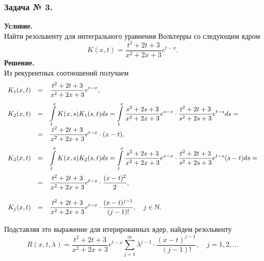 \subsubsection*{\center Задача № 3.}
{\bf Условие.~}\\
Найти резольвенту для интегрального уравнения Вольтерры со следующим ядром 
$$K(x,t)=\dfrac{t^2+2t+3}{x^2+2x+3}e^{t-x}.$$
\noindent
{\bf Решение.~}\\
Из рекурентных соотношений получаем
$$
\begin{array}{rcl}
K_1(x,t)&=&\displaystyle \dfrac{t^2+2t+3}{x^2+2x+3}e^{t-x}, \\[12pt]
K_2(x,t)&=&\displaystyle\int\limits_t^x K(x,s)K_1(s,t)ds = \int\limits_t^x \dfrac{s^2+2s+3}{x^2+2x+3}e^{s-x}\cdot\dfrac{t^2+2t+3}{s^2+2s+3}e^{t-s} ds = \\ [12pt] 
&=& \dfrac{t^2+2t+3}{x^2+2x+3}e^{t-x}\cdot(x-t),\\[12pt] \medskip
K_3(x,t)&=&\displaystyle\int\limits_t^x K(x,s)K_2(s,t)ds = \int\limits_t^x \dfrac{s^2+2s+3}{x^2+2x+3}e^{s-x}\cdot\dfrac{t^2+2t+3}{s^2+2s+3}e^{t-s}(s-t) ds= \\ [12pt] \medskip
&=& \dfrac{t^2+2t+3}{x^2+2x+3}e^{t-x}\cdot\dfrac{(x-t)^2}{2},\\[12pt] \medskip
K_j(x,t)&=&\displaystyle\dfrac{t^2+2t+3}{x^2+2x+3}e^{t-x}\cdot\dfrac{(x-t)^{j-1}}{(j-1)!}, \quad j\in\mathbb{N}.
\end{array}
$$
Подставляя это выражение для итерированных ядер, найдем резольвенту
$$ 
R(x,t,\lambda)=\dfrac{t^2+2t+3}{x^2+2x+3}e^{t-x}\sum_{j=1}^\infty \lambda^{j-1}\cdot\frac{(x-t)^{j-1}}{(j-1)!},
\quad j=1,2,\ldots
$$
